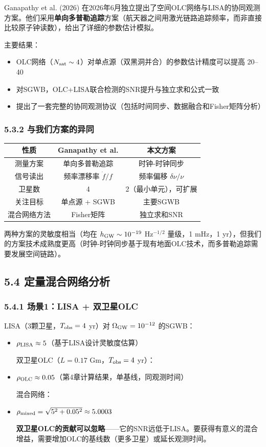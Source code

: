 \documentclass[12pt,a4paper]{article}
\begin{document}
Ganapathy et al. (2026) 在2026年6月独立提出了空间OLC网络与LISA的协同观测方案\cite{ref11}。他们采用\textbf{单向多普勒追踪}方案（航天器之间用激光链路追踪频率，而非直接比较原子钟读数），给出了详细的参数估计模拟。

主要结果：
\begin{itemize}
  \item OLC网络（$N_{\rm sat} \sim 4$）对单点源（双黑洞并合）的参数估计精度可以提高 20–40%
  \item 对SGWB，OLC+LISA联合检测的SNR提升与独立求和公式一致
  \item 提出了一套完整的协同观测协议（包括时间同步、数据融合和Fisher矩阵分析）

\end{itemize}
\subsubsection{5.3.2 与我们方案的异同}


\begin{tabular}{|c|c|c|}
\hline
性质 & Ganapathy et al. & 本文方案 \\
\hline
测量方案 & 单向多普勒追踪 & 时钟-时钟同步 \\
信号读出 & 频率漂移率 $\dot{f}/f$ & 频率偏移 $\delta\nu/\nu$ \\
卫星数 & 4 & 2（最小单元），可扩展 \\
关注目标 & 单点源 + SGWB & 主要SGWB \\
混合网络方法 & Fisher矩阵 & 独立求和SNR \\
\hline
\end{tabular}


两种方案的灵敏度相当（均在 $h_{\rm GW} \sim 10^{-19}$ Hz$^{-1/2}$ 量级，1 mHz，1 yr），但我们的方案技术成熟度更高（时钟-时钟同步基于现有地面OLC技术，而多普勒追踪需要发展空间链路）。

\subsection{5.4 定量混合网络分析}


\subsubsection{5.4.1 场景1：LISA + 双卫星OLC}


LISA（3颗卫星，$T_{\rm obs} = 4$ yr）对 $\Omega_{\rm GW} = 10^{-12}$ 的SGWB：
\begin{itemize}
  \item $\rho_{\rm LISA} \approx 5$（基于LISA设计灵敏度估算）

双卫星OLC（$L = 0.17$ Gm，$T_{\rm obs} = 4$ yr）：
  \item $\rho_{\rm OLC} \approx 0.05$（第4章计算结果，单基线，同观测时间）

混合网络：
  \item $\rho_{\rm mixed} = \sqrt{5^2 + 0.05^2} \approx 5.0003$

\textbf{双卫星OLC的贡献可以忽略}——它的SNR远低于LISA。要获得有意义的混合增益，需要增加OLC的基线数（更多卫星）或延长观测时间。

\end{itemize}
\end{document}
